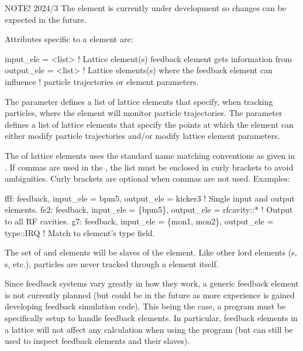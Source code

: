 NOTE! 2024/3 The  element is currently under development so changes can be expected in the future.

Attributes specific to a  element are:
\begin{example}
  input_ele  = <list>   ! Lattice element(s) feedback element gets information from
  output_ele = <list>   ! Lattice elements(s) where the feedback element can influence
                        !   particle trajectories or element parameters.
\end{example}

The  parameter defines a list of lattice elements that specify, when tracking particles,
where the  element will monitor particle trajectories. The  parameter
defines a list of lattice elements that specify the points at which the  element can
either modify particle trajectories and/or modify lattice element parameters.

The  of lattice elements uses the standard \bmad name matching conventions as given in
. If commas are used in the , the list must be enclosed in curly
brackets  to avoid ambiguities. Curly brackets are optional when commas are not
used. Examples:
\begin{example}
  fff: feedback, input_ele = bpm5, 
                  output_ele = kicker3      ! Single input and output elements.
  fe2: feedback, input_ele = \{bpm5\}, 
                  output_ele = rfcavity::*  ! Output to all RF cavities.
  g7: feedback, input_ele = \{mon1, mon2\}, 
                  output_ele = type::IRQ    ! Match to element's type field.
\end{example}

The set of  and  elements will be  slaves of the
  element. Like other lord elements (s, s,
etc.), particles are never tracked through a  element itself.

Since feedback systems vary greatly in how they work, a generic feedback element is not currently
planned (but could be in the future as more experience is gained developing feedback simulation
code).  This being the case, a program must be specifically setup to handle feedback elements. In
particular, feedback elements in a lattice will not affect any calculation when using the 
program (but  can still be used to inspect feedback elements and their slaves).

